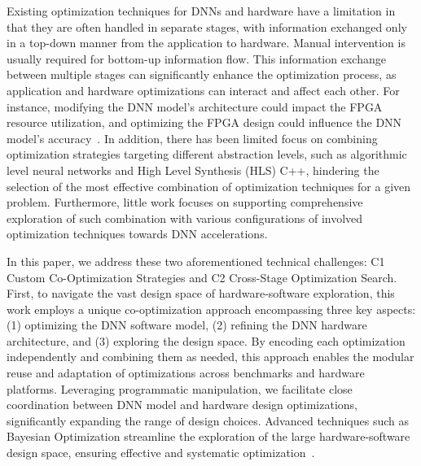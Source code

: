 Existing optimization techniques for DNNs and hardware have a limitation in that they are often handled in separate stages, with information exchanged only in a top-down manner from the application to hardware. Manual intervention is usually required for bottom-up information flow. This information exchange between multiple stages can significantly enhance the optimization process, as application and hardware optimizations can interact and affect each other. For instance, modifying the DNN model's architecture could impact the FPGA resource utilization, and optimizing the FPGA design could influence the DNN model's accuracy~\cite{wang2019deep}. In addition, there has been limited focus on combining optimization strategies targeting different abstraction levels, such as algorithmic level neural networks and High Level Synthesis (HLS) C++, hindering the selection of the most effective combination of optimization techniques for a given problem. Furthermore, little work focuses on supporting comprehensive exploration of such combination with various configurations of involved optimization techniques towards DNN accelerations. 

In this paper, we address these two aforementioned technical challenges: C1 Custom Co-Optimization Strategies and C2 Cross-Stage Optimization Search. 
First, to navigate the vast design space of hardware-software exploration, this work employs a unique co-optimization approach encompassing three key aspects: (1) optimizing the DNN software model, (2) refining the DNN hardware architecture, and (3) exploring the design space. By encoding each optimization independently and combining them as needed, this approach enables the modular reuse and adaptation of optimizations across benchmarks and hardware platforms. Leveraging programmatic manipulation, we facilitate close coordination between DNN model and hardware design optimizations, significantly expanding the range of design choices. Advanced techniques such as Bayesian Optimization streamline the exploration of the large hardware-software design space, ensuring effective and systematic optimization~\cite{reagen2017case, mehrabi2020bayesian, tuli2023codebench}. 

